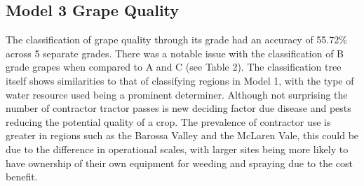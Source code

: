 \documentclass[review,12pt,authoryear]{elsarticle}
\begin{document}
\begin{linenumbers}
\subsection{Model 3 Grape Quality}
The classification of grape quality through its grade had an accuracy of 55.72\% across 5 separate grades. There was a notable issue with the classification of B grade grapes when compared to A and C (see Table 2). The classification tree itself shows similarities to that of classifying regions in Model 1, with the type of water resource used being a prominent determiner. Although not surprising the number of contractor tractor passes is new deciding factor due disease and pests reducing the potential quality of a crop. The prevalence of contractor use is greater in regions such as the Barossa Valley and the McLaren Vale, this could be due to the difference in operational scales, with larger sites being more likely to have ownership of their own equipment for weeding and spraying due to the cost benefit.


\end{linenumbers}
\end{document}
